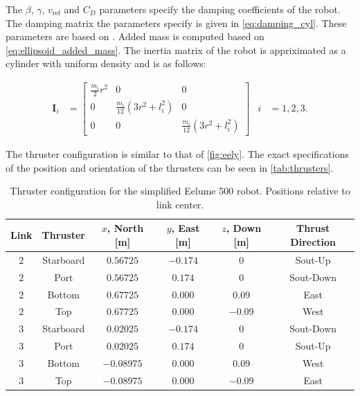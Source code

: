 The $\beta$, $\gamma$, $v_{\mathrm{ref}}$ and $C_D$ parameters specify the damping
coefficients of the robot. The damping matrix the parameters specify is given in
\autoref{eq:damping_cyl}. These parameters are based on \cite{bendik}. Added mass
is computed based on \autoref{eq:ellipsoid_added_mass}.
The inertia matrix of the robot is appriximated as a
cylinder with uniform density and is as follows:

\begin{align}
    \bm{I}_i &=
    \begin{bmatrix}
        \frac{m_i}{2} r^2 & 0 & 0 \\
        0 & \frac{m_i}{12} (3r^2 + l_i^2) & 0 \\
        0 & 0 & \frac{m_i}{12} (3r^2 + l_i^2)
    \end{bmatrix} &
    i &= 1, 2, 3.
\end{align}

The thruster configuration is similar to that of \autoref{fig:eely}. The exact
specifications of the position and orientation of the thrusters can be seen in
\autoref{tab:thrusters}.

\begin{table}[h]
    \centering
    \begin{tabular}{|c|c|c|c|c|c|}
        \hline
        Link & Thruster & $x$, North [m] & $y$, East [m] & $z$, Down [m] & Thrust Direction \\ \hline
        $2$ & Starboard & $0.56725$ & $-0.174$ & $0$ & Sout-Up \\
        $2$ & Port & $0.56725$ & $0.174$ & $0$ & Sout-Down \\
        $2$ & Bottom & $0.67725$ & $0.000$ & $0.09$ & East \\
        $2$ & Top & $0.67725$ & $0.000$ & $-0.09$ & West \\
        $3$ & Starboard & $0.02025$ & $-0.174$ & $0$ & Sout-Down \\
        $3$ & Port & $0.02025$ & $0.174$ & $0$ & Sout-Up \\
        $3$ & Bottom & $-0.08975$ & $0.000$ & $0.09$ & West \\
        $3$ & Top & $-0.08975$ & $0.000$ & $-0.09$ & East \\
        \hline
    \end{tabular}
    \caption{Thruster configuration for the simplified Eelume 500 robot. Positions relative to link center.}
    \label{tab:thrusters}
\end{table}

